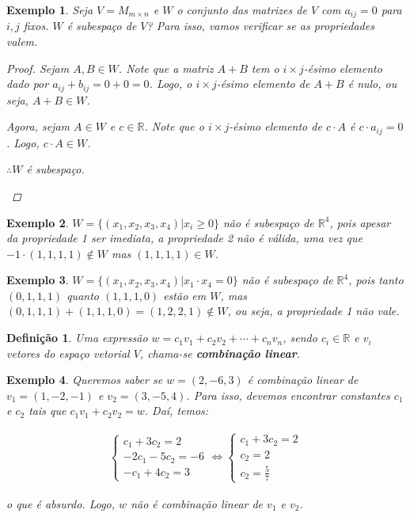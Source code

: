 \documentclass{article}
\newtheorem*{definition}{Definição}
\newtheorem*{example}{Exemplo}
\begin{document}
\begin{example}
	Seja $V = M_{m\times n}$ e $W$ o conjunto das matrizes de $V$ com $a_{ij} = 0$ para $i,j$ fixos. $W$ é subespaço de $V$? Para isso, vamos verificar se as propriedades valem.
	\begin{proof}
		Sejam $A,B\in W$. Note que a matriz $A+B$ tem o $i\times j$-ésimo elemento dado por $a_{ij} + b_{ij} = 0+0 = 0$. Logo, o $i\times j$-ésimo elemento de $A+B$ é nulo, ou seja, $A+B\in W$.
		\par\vspace{0.4cm}\hspace{12pt} Agora, sejam $A\in W$ e $c\in\mathbb{R}$. Note que o $i\times j$-ésimo elemento de $c\cdot A$ é $c\cdot a_{ij} = 0$. Logo, $ c\cdot A\in W$.
		\begin{center}
			$\therefore W$ é subespaço.
		\end{center}
	\end{proof}
\end{example}

\begin{example}
	$W = \{(x_1, x_2, x_3, x_4)|x_i\geq 0\}$ não é subespaço de $\mathbb{R}^4$, pois apesar da propriedade 1 ser imediata, a propriedade 2 não é válida, uma vez que $-1\cdot(1,1,1,1)\notin W$ mas $(1,1,1,1)\in W$.
\end{example}

\begin{example}
	$W = \{ (x_1, x_2, x_3, x_4)|x_1\cdot x_4 = 0 \}$ não é subespaço de $\mathbb{R}^4$, pois tanto $(0,1,1,1)$ quanto $(1,1,1,0)$ estão em $W$, mas $(0,1,1,1) + (1,1,1,0) = (1,2,2,1)\notin W$, ou seja, a propriedade 1 não vale.
\end{example}

\begin{definition}
	Uma expressão $w = c_1v_1 + c_2v_2 + \cdots + c_nv_n$, sendo $c_i\in\mathbb{R}$ e $v_i$ vetores do espaço vetorial $V$, chama-se \textbf{combinação linear}.
\end{definition}

\begin{example}
	Queremos saber se $w = (2,-6,3)$ é combinação linear de $v_1 = (1,-2,-1)$ e $v_2 = (3,-5,4)$. Para isso, devemos encontrar constantes $c_1$ e $c_2$ tais que $c_1v_1 + c_2v_2 = w$. Daí, temos:
	
	\begin{align*}
	\begin{cases}
	c_1 + 3c_2 = 2 \\
	-2c_1 - 5c_2 = -6 \\
	-c_1 + 4c_2 = 3
	\end{cases}\Leftrightarrow \begin{cases}
	c_1 + 3c_2 = 2 \\
	c_2 = 2 \\
	c_2 = \displaystyle{\frac{5}{7}}
	\end{cases}
	\end{align*}
	\par\vspace{0.3cm} o que é absurdo. Logo, $w$ não é combinação linear de $v_1$ e $v_2$.
\end{example}
\end{document}
